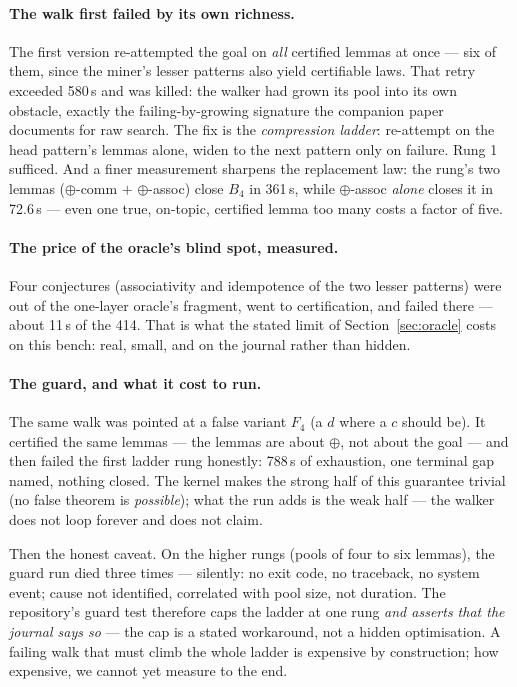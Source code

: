 \documentclass[11pt]{article}
\theoremstyle{remark}\newtheorem{remark}{Remark}
\begin{document}
\paragraph{The walk first failed by its own richness.} The first version
re-attempted the goal on \emph{all} certified lemmas at once --- six of them,
since the miner's lesser patterns also yield certifiable laws. That retry
exceeded 580\,s and was killed: the walker had grown its pool into its own
obstacle, exactly the failing-by-growing signature the companion paper
documents for raw search. The fix is the \emph{compression ladder}: re-attempt
on the head pattern's lemmas alone, widen to the next pattern only on
failure. Rung 1 sufficed. And a finer measurement sharpens the replacement
law: the rung's two lemmas ($\oplus$-comm $+$ $\oplus$-assoc) close $B_4$ in
361\,s, while $\oplus$-assoc \emph{alone} closes it in 72.6\,s ---
even one true, on-topic, certified lemma too many costs a factor of five.

\paragraph{The price of the oracle's blind spot, measured.} Four conjectures
(associativity and idempotence of the two lesser patterns) were out of the
one-layer oracle's fragment, went to certification, and failed there ---
about 11\,s of the 414. That is what the stated limit of
Section~\ref{sec:oracle} costs on this bench: real, small, and on the
journal rather than hidden.

\paragraph{The guard, and what it cost to run.} The same walk was pointed at
a false variant $F_4$ (a $d$ where a $c$ should be). It certified the same
lemmas --- the lemmas are about $\oplus$, not about the goal --- and then
failed the first ladder rung honestly: 788\,s of exhaustion, one terminal gap
named, nothing closed. The kernel makes the strong half of this guarantee
trivial (no false theorem is \emph{possible}); what the run adds is the weak
half --- the walker does not loop forever and does not claim.

Then the honest caveat. On the higher rungs (pools of four to six lemmas),
the guard run died three times --- silently: no exit code, no traceback, no
system event; cause not identified, correlated with pool size, not duration.
The repository's guard test therefore caps the ladder at one rung
\emph{and asserts that the journal says so} --- the cap is a stated
workaround, not a hidden optimisation. A failing walk that must climb the
whole ladder is expensive by construction; how expensive, we cannot yet
measure to the end.
\end{document}
